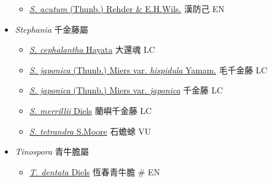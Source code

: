 \begin{itemize}
  \begin{itemize}
        \item[] \href{http://www.theplantlist.org/tpl1.1/search?q=Sinomenium+acutum}{\textit{S. acutum} (Thunb.) Rehder \& E.H.Wils.}   漢防己   EN
  \end{itemize}
 \item[] \textit{Stephania} 千金藤屬
                                
  \begin{itemize}
        \item[] \href{http://www.theplantlist.org/tpl1.1/search?q=Stephania+cephalantha}{\textit{S. cephalantha} Hayata}   大還魂   LC
        \item[] \href{http://www.theplantlist.org/tpl1.1/search?q=Stephania+japonica+var.+hispidula}{\textit{S. japonica} (Thunb.) Miers var. \textit{hispidula} Yamam.}   毛千金藤   LC
        \item[] \href{http://www.theplantlist.org/tpl1.1/search?q=Stephania+japonica+var.+japonica}{\textit{S. japonica} (Thunb.) Miers var. \textit{japonica}}   千金藤   LC
        \item[] \href{http://www.theplantlist.org/tpl1.1/search?q=Stephania+merrillii}{\textit{S. merrillii} Diels}   蘭嶼千金藤   LC
        \item[] \href{http://www.theplantlist.org/tpl1.1/search?q=Stephania+tetrandra}{\textit{S. tetrandra} S.Moore}   石蟾蜍   VU
  \end{itemize}
 \item[] \textit{Tinospora} 青牛膽屬
                                
  \begin{itemize}
        \item[] \href{http://www.theplantlist.org/tpl1.1/search?q=Tinospora+dentata}{\textit{T. dentata} Diels}   恆春青牛膽  \# EN
  \end{itemize}
  \end{itemize}
